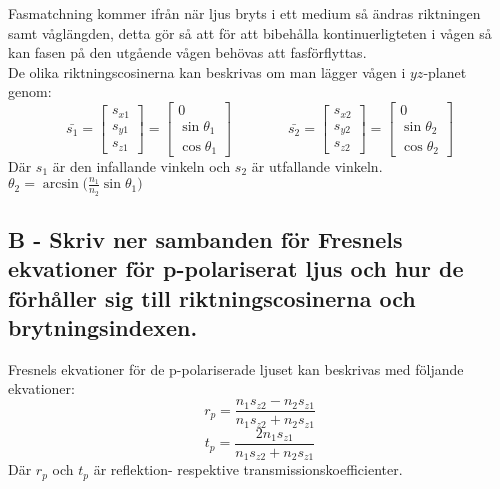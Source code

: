 \documentclass{article}
\begin{document}
    Fasmatchning kommer ifrån när ljus bryts i ett medium så ändras riktningen samt våglängden, detta gör så att för att bibehålla kontinuerligteten i vågen så kan fasen på den utgående vågen behövas att fasförflyttas. \\

    De olika riktningscosinerna kan beskrivas om man lägger vågen i $yz$-planet genom:
    \[
      \bar{s_1} =
      \begin{bmatrix}
        s_{x1}\\s_{y1}\\s_{z1}
      \end{bmatrix}
      =
      \begin{bmatrix}
        0\\\sin{\theta_1}\\\cos{\theta_1}
      \end{bmatrix}
      \qquad\qquad
      \bar{s_2} =
      \begin{bmatrix}
        s_{x2}\\s_{y2}\\s_{z2}
      \end{bmatrix}
      =
      \begin{bmatrix}
        0\\\sin{\theta_2}\\\cos{\theta_2}
      \end{bmatrix}
    \]
    Där $s_1$ är den infallande vinkeln och $s_2$ är utfallande vinkeln. $\theta_2=\arcsin{\big(\frac{n_1}{n_2}\sin{\theta_1}\big)}$

  \subsection*{B - Skriv ner sambanden för Fresnels ekvationer för p-polariserat ljus och hur de förhåller sig till riktningscosinerna och brytningsindexen.}
    Fresnels ekvationer för de p-polariserade ljuset kan beskrivas med följande ekvationer:
    \[
      r_p = \frac{n_1s_{z2}-n_2s_{z1}}{n_1s_{z2}+n_2s_{z1}}
    \]
    \[
      t_p = \frac{2n_1s_{z1}}{n_1s_{z2}+n_2s_{z1}}
    \]
    Där $r_p$ och $t_p$ är reflektion- respektive transmissionskoefficienter.
\end{document}

